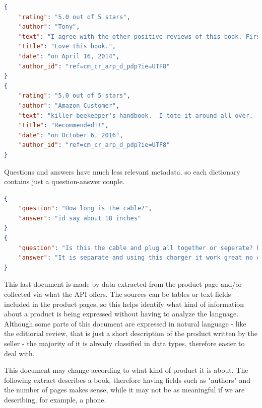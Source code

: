 \documentclass[LaM,binding=0.6cm]{sapthesis}
\begin{document}
\begin{lstlisting}[language=json,firstnumber=1]
{
	"rating": "5.0 out of 5 stars", 
	"author": "Tony", 
	"text": "I agree with the other positive reviews of this book. First, it provides a lot of useful information. All of my questions were answered in this book, and then some. Second, it's just a high quality, good looking book. If you read this book and you are not sure you want to be a beekeeper, you should probably decide not to be a beekeeper.", 
	"title": "Love this book.", 
	"date": "on April 16, 2014", 
	"author_id": "ref=cm_cr_arp_d_pdp?ie=UTF8"
}
{
	"rating": "5.0 out of 5 stars", 
	"author": "Amazon Customer", 
	"text": "killer beekeeper's handbook.  I tote it around all over.  Has helped me gain much knowledge for my new hive!  Recommended!!", 
	"title": "Recommended!!", 
	"date": "on October 6, 2016", 
	"author_id": "ref=cm_cr_arp_d_pdp?ie=UTF8"
}
\end{lstlisting}

Questions and answers have much less relevant metadata. so each dictionary contains just a question-answer couple.

\begin{lstlisting}[language=json,firstnumber=1]
{
	"question": "How long is the cable?",
	"answer": "id say about 18 inches" 
}
{
	"question": "Is this the cable and plug all together or seperate? Picture shows cable and box, then one together which doesn't come apart?",
	"answer": "It is separate and using this charger it work great no complaints happy with product."
}
\end{lstlisting}

This last document is made by data extracted from the product page and/or collected via what the API offers. 
The sources can be tables or text fields included in the product pages, so this helps identify what kind of information about a product is being expressed without having to analyze the language. Although some parts of this document are expressed in natural language - like the editiorial review, that is just a short description of the product written by the seller - the majority of it is already classified in data types, therefore easier to deal with.

This document may change according to what kind of product it is about. The following extract describes a book, therefore having fields such as "authors" and the number of pages makes sense, while it may not be as meaningful if we are describing, for example, a phone.
\end{document}
